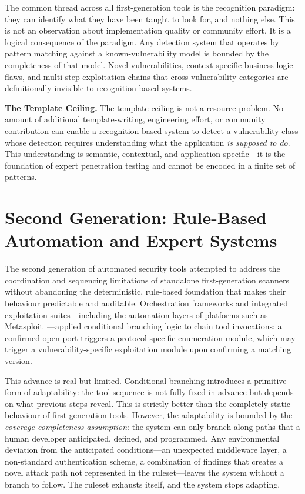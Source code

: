 \documentclass[12pt,a4paper,oneside,openany]{book}
\newcommand{\term}[1]{\textit{#1}}
\begin{document}
The common thread across all first-generation tools is the recognition paradigm: they can identify what they have been taught to look for, and nothing else. This is not an observation about implementation quality or community effort. It is a logical consequence of the paradigm. Any detection system that operates by pattern matching against a known-vulnerability model is bounded by the completeness of that model. Novel vulnerabilities, context-specific business logic flaws, and multi-step exploitation chains that cross vulnerability categories are definitionally invisible to recognition-based systems.


\noindent\textbf{The Template Ceiling.} The template ceiling is not a resource problem. No amount of additional template-writing, engineering effort, or community contribution can enable a recognition-based system to detect a vulnerability class whose detection requires understanding what the application \textit{is supposed to do}. This understanding is semantic, contextual, and application-specific---it is the foundation of expert penetration testing and cannot be encoded in a finite set of patterns.


\section{Second Generation: Rule-Based Automation and Expert Systems}

The second generation of automated security tools attempted to address the coordination and sequencing limitations of standalone first-generation scanners without abandoning the deterministic, rule-based foundation that makes their behaviour predictable and auditable. Orchestration frameworks and integrated exploitation suites---including the automation layers of platforms such as Metasploit~\citep{kennedy2011metasploit}---applied conditional branching logic to chain tool invocations: a confirmed open port triggers a protocol-specific enumeration module, which may trigger a vulnerability-specific exploitation module upon confirming a matching version.

This advance is real but limited. Conditional branching introduces a primitive form of adaptability: the tool sequence is not fully fixed in advance but depends on what previous steps reveal. This is strictly better than the completely static behaviour of first-generation tools. However, the adaptability is bounded by the \term{coverage completeness assumption}: the system can only branch along paths that a human developer anticipated, defined, and programmed. Any environmental deviation from the anticipated conditions---an unexpected middleware layer, a non-standard authentication scheme, a combination of findings that creates a novel attack path not represented in the ruleset---leaves the system without a branch to follow. The ruleset exhausts itself, and the system stops adapting.
\end{document}
